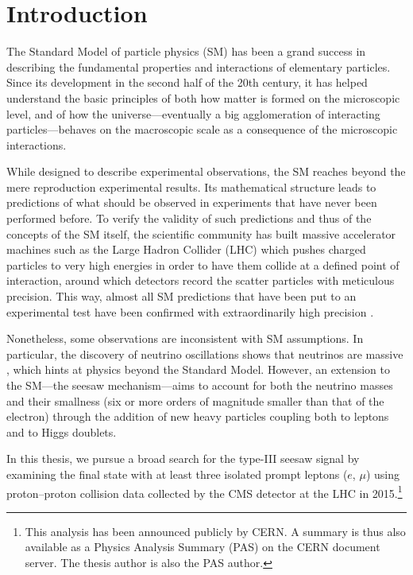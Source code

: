 \chapter{Introduction}
\label{sec:Introduction}

The Standard Model of particle physics (SM) \cite{i2003gauge,aitchison2003gauge,Peskin:257493} has been a grand success in describing the fundamental properties and interactions of elementary particles. Since its development in the second half of the 20th century, it has helped understand the basic principles of both how matter is formed on the microscopic level, and of how the universe\hairspace---\hairspace{}eventually a big agglomeration of interacting particles\hairspace---\hairspace{}behaves on the macroscopic scale as a consequence of the microscopic interactions.

While designed to describe experimental observations, the SM reaches beyond the mere reproduction experimental results. Its mathematical structure leads to predictions of what should be observed in experiments that have never been performed before. To verify the validity of such predictions and thus of the concepts of the SM itself, the scientific community has built massive accelerator machines such as the Large Hadron Collider (LHC) \cite{Evans:2008zzb} which pushes charged particles to very high energies in order to have them collide at a defined point of interaction, around which detectors record the scatter particles with meticulous precision. This way, almost all SM predictions that have been put to an experimental test have been confirmed with extraordinarily high precision \cite{Agashe:2014kda}.

Nonetheless, some observations are inconsistent with SM assumptions. In particular, the discovery of neutrino oscillations shows that neutrinos are massive \cite{Nustatus}, which hints at physics beyond the Standard Model. However, an extension to the SM\hairspace---\hairspace{}the seesaw mechanism\hairspace---\hairspace{}aims to account for both the neutrino masses and their smallness (six or more orders of magnitude smaller than that of the electron) through the addition of new heavy particles coupling both to leptons and to Higgs doublets.

In this thesis, we pursue a broad search for the type-III seesaw signal \cite{SeesawIII:a} by examining the final state with at least three isolated prompt leptons ($e$, $\mu$) using proton--proton collision data collected by the CMS detector \cite{Chatrchyan:2008zzk} at the LHC in 2015.\footnote{This analysis has been announced publicly by CERN. A summary is thus also available as a Physics Analysis Summary (PAS) \cite{CMS-PAS-EXO-16-002} on the CERN document server. The thesis author is also the PAS author.}

